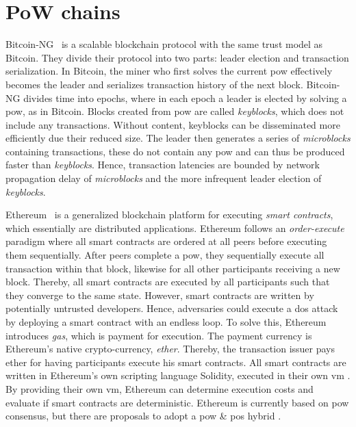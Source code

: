 \documentclass[USenglish]{uit-thesis}
\begin{document}
\section{PoW chains}
Bitcoin-NG~\cite{ng} is a scalable blockchain protocol with the same trust model as Bitcoin.
They divide their protocol into two parts: leader election and transaction serialization.
In Bitcoin, the miner who first solves the current \gls{pow} effectively becomes the leader and serializes transaction history of the next block.
Bitcoin-NG divides time into epochs, where in each epoch a leader is elected by solving a \gls{pow}, as in Bitcoin.
Blocks created from \gls{pow} are called \textit{keyblocks}, which does not include any transactions.
Without content, keyblocks can be disseminated more efficiently due their reduced size.
The leader then generates a series of \textit{microblocks} containing transactions, these do not contain any \gls{pow} and can thus be produced faster than \textit{keyblocks}.
Hence, transaction latencies are bounded by network propagation delay of \textit{microblocks} and the more infrequent leader election of \textit{keyblocks}.


Ethereum~\cite{ether} is a generalized blockchain platform for executing \textit{smart contracts}, which essentially are distributed applications.
Ethereum follows an \textit{order-execute} paradigm where all smart contracts are ordered at all peers before executing them sequentially.
After peers complete a \gls{pow}, they sequentially execute all transaction within that block, likewise for all other participants receiving a new block.
Thereby, all smart contracts are executed by all participants such that they converge to the same state.
However, smart contracts are written by potentially untrusted developers.
Hence, adversaries could execute a \gls{dos} attack by deploying a smart contract with an endless loop.
To solve this, Ethereum introduces \textit{gas}, which is payment for execution.
The payment currency is Ethereum's native crypto-currency, \textit{ether}.
Thereby, the transaction issuer pays ether for having participants execute his smart contracts.
All smart contracts are written in Ethereum's own scripting language Solidity, executed in their own \gls{vm} \cite{ethervm, solidity}.
By providing their own \gls{vm}, Ethereum can determine execution costs and evaluate if smart contracts are deterministic.
Ethereum \cite{ether} is currently based on \gls{pow} consensus, but there are proposals to adopt a \gls{pow} \& \gls{pos} hybrid \cite{casper}.
\end{document}
